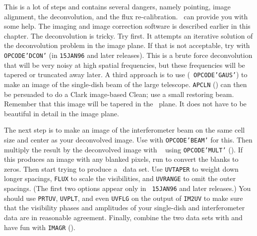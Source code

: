      This is a lot of steps and contains several dangers, namely
pointing, image alignment, the deconvolution, and the flux
re-calibration.  \AIPS\ can provide you with some help.  The imaging
and image correction software is described earlier in this chapter.
The deconvolution is tricky.  Try {\tt {}} first.  It
attempts an iterative solution of the deconvolution problem in the
image plane. If that is not acceptable, try {\tt {}} with
{\tt OPCODE\qs'DCON'} (in {\tt 15JAN96} and later releases).  This is
a brute force deconvolution that will be very noisy at high spatial
frequencies, but these frequencies will be tapered or truncated away
later.  A third approach is to use {\tt {}} ({\tt
OPCODE\qs'GAUS'}) to make an image of the single-dish beam of the
large telescope.  {\tt APCLN} () can then be persuaded to
do a Clark image-based Clean; use a small restoring beam.  Remember
that this image will be tapered in the \uv\ plane.  It does not
have to be beautiful in detail in the image plane.

     The next step is to make an image of the interferometer
 beam on the same cell size and center as your
deconvolved image.  Use {\tt {}} with {\tt OPCODE\qs'BEAM'}
for this.  Then multiply the result by the deconvolved image with {\tt
{}} using {\tt OPCODE\qs'MULT'} ().  If this
produces an image with any blanked pixels, run {\tt {}} to
convert the blanks to zeros.  Then start trying {\tt {}} to
produce a \uv\ data set.  Use {\tt UVTAPER} to weight down longer
spacings, {\tt FLUX} to scale the visibilities, and {\tt UVRANGE} to
omit the outer spacings.  (The first two options appear only in {\tt
15JAN96} and later releases.) You should use {\tt PRTUV}, {\tt UVPLT},
and even {\tt UVFLG} on the output of {\tt IM2UV} to make sure that
the visibility phases and amplitudes of your single-dish and
interferometer data are in reasonable agreement.  Finally, combine the
two data sets with {\tt {}} and have fun with {\tt IMAGR}
().

\vfill\eject

